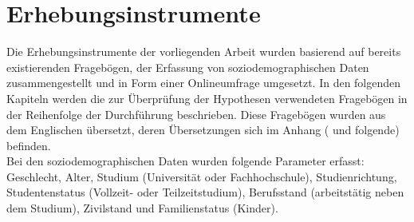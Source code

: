 \section{Erhebungsinstrumente}\label{section.erhebungsinstrumente}
Die Erhebungsinstrumente der vorliegenden Arbeit wurden basierend auf bereits existierenden Fragebögen, der Erfassung von soziodemographischen Daten zusammengestellt und in Form einer Onlineumfrage umgesetzt. In den folgenden Kapiteln werden die zur Überprüfung der Hypothesen verwendeten Fragebögen in der Reihenfolge der Durchführung beschrieben. Diese Fragebögen wurden aus dem Englischen übersetzt, deren Übersetzungen sich im Anhang ( und folgende) befinden. \\
Bei den soziodemographischen Daten wurden folgende Parameter erfasst: Geschlecht, Alter, Studium (Universität oder Fachhochschule), Studienrichtung, Studentenstatus (Vollzeit- oder Teilzeitstudium), Berufsstand (arbeitstätig neben dem Studium), Zivilstand und Familienstatus (Kinder). \\
